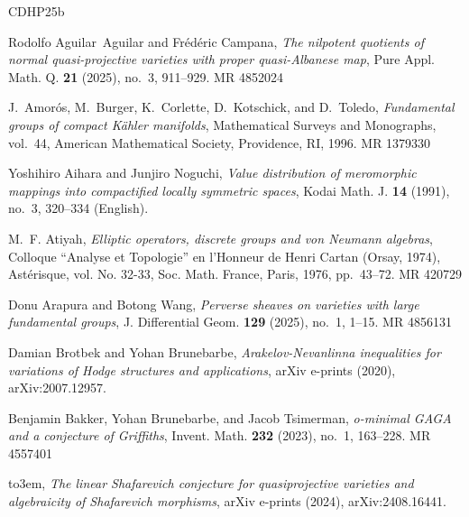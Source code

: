 \documentclass[english]{amsproc}
\theoremstyle{plain}
\theoremstyle{definition}
\theoremstyle{remark}
\theoremstyle{plain}
\numberwithin{equation}{thm} %
\begin{document}
	\newcommand{\etalchar}[1]{$^{#1}$}
	\providecommand{\bysame}{\leavevmode\hbox to3em{\hrulefill}\thinspace}
	\providecommand{\MR}{\relax\ifhmode\unskip\space\fi MR }
	\providecommand{\MRhref}[2]{%
		\href{http://www.ams.org/mathscinet-getitem?mr=#1}{#2}
	}
	\providecommand{\href}[2]{#2}
	\begin{thebibliography}{CDHP25b}
		
		Rodolfo Aguilar~Aguilar and Fr\'ed\'eric Campana, \emph{The nilpotent quotients
			of normal quasi-projective varieties with proper quasi-{A}lbanese map}, Pure
		Appl. Math. Q. \textbf{21} (2025), no.~3, 911--929. \MR{4852024}
		
		\bibitem[ABC{\etalchar{+}}96]{ABCKT}
		J.~Amor\'os, M.~Burger, K.~Corlette, D.~Kotschick, and D.~Toledo,
		\emph{Fundamental groups of compact {K}\"ahler manifolds}, Mathematical
		Surveys and Monographs, vol.~44, American Mathematical Society, Providence,
		RI, 1996. \MR{1379330}
		
		Yoshihiro {Aihara} and Junjiro {Noguchi}, \emph{{Value distribution of
				meromorphic mappings into compactified locally symmetric spaces}}, {Kodai
			Math. J.} \textbf{14} (1991), no.~3, 320--334 (English).
		
		M.~F. Atiyah, \emph{Elliptic operators, discrete groups and von {N}eumann
			algebras}, Colloque ``{A}nalyse et {T}opologie'' en l'{H}onneur de {H}enri
		{C}artan ({O}rsay, 1974), Ast\'{e}risque, vol. No. 32-33, Soc. Math. France,
		Paris, 1976, pp.~43--72. \MR{420729}
		
		Donu Arapura and Botong Wang, \emph{Perverse sheaves on varieties with large
			fundamental groups}, J. Differential Geom. \textbf{129} (2025), no.~1, 1--15.
		\MR{4856131}
		
		Damian {Brotbek} and Yohan {Brunebarbe}, \emph{{Arakelov-Nevanlinna
				inequalities for variations of Hodge structures and applications}}, arXiv
		e-prints (2020), arXiv:2007.12957.
		
		Benjamin Bakker, Yohan Brunebarbe, and Jacob Tsimerman, \emph{o-minimal {GAGA}
			and a conjecture of {G}riffiths}, Invent. Math. \textbf{232} (2023), no.~1,
		163--228. \MR{4557401}
		
		\bysame, \emph{{The linear Shafarevich conjecture for quasiprojective varieties
				and algebraicity of Shafarevich morphisms}}, arXiv e-prints (2024),
		arXiv:2408.16441.
		

\end{thebibliography}
\end{document}
